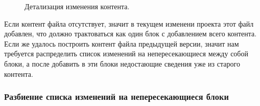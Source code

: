 \documentclass[a4paper,14pt]{extreport} %
\begin{document}
\begin{figure}[H]
\caption{Детализация изменения контента.}
\label{user-stories}
\end{figure}
Если контент файла отсутствует, значит в текущем изменени проекта этот файл добавлен, что должно трактоваться как один блок с добавлением всего контента. Если же удалось построить контент файла предыдущей версии, значит нам требуется распределить список изменений на непересекающиеся между собой блоки, а после добавить в эти блоки недостающие сведения уже из старого контента.

\newpage
\subsubsection{Разбиение списка изменений на непересекающиеся блоки}
\end{document}

